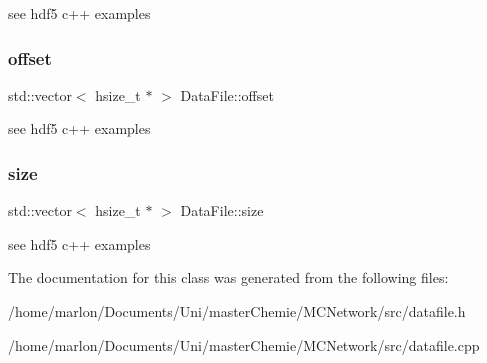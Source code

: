 see hdf5 c++ examples \mbox{\label{classDataFile_a6574c6c8e7e7a161b1a97f5ab669e2a6}} 
\subsubsection{\texorpdfstring{offset}{offset}}
{\footnotesize\ttfamily std\+::vector$<$ hsize\+\_\+t $\ast$ $>$ Data\+File\+::offset\hspace{0.3cm}{\ttfamily [private]}}

see hdf5 c++ examples \mbox{\label{classDataFile_ace2d4ef0b734ca4f1945b60f3acc9912}} 
\subsubsection{\texorpdfstring{size}{size}}
{\footnotesize\ttfamily std\+::vector$<$ hsize\+\_\+t $\ast$ $>$ Data\+File\+::size\hspace{0.3cm}{\ttfamily [private]}}

see hdf5 c++ examples 

The documentation for this class was generated from the following files\+:\begin{DoxyCompactItemize}
\item 
/home/marlon/\+Documents/\+Uni/master\+Chemie/\+M\+C\+Network/src/datafile.\+h\item 
/home/marlon/\+Documents/\+Uni/master\+Chemie/\+M\+C\+Network/src/datafile.\+cpp\end{DoxyCompactItemize}
